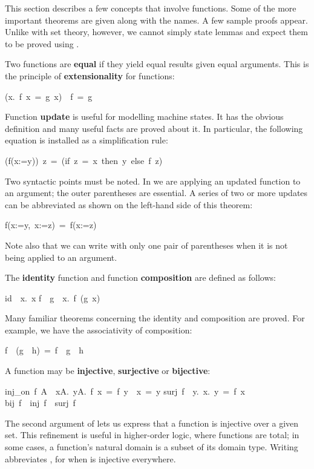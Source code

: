This section describes a few concepts that involve functions. 
Some of the more important theorems are given along with the 
names. A few sample proofs appear. Unlike with set theory, however, 
we cannot simply state lemmas and expect them to be proved using {}. 

Two functions are \textbf{equal} if they yield equal results given equal arguments. 
This is the principle of \textbf{extensionality} for functions:
\begin{isabelle}
({\isasymAnd}x.\ f\ x\ =\ g\ x)\ {\isasymLongrightarrow}\ f\ =\ g
\end{isabelle}


Function \textbf{update} is useful for modelling machine states. It has 
the obvious definition and many useful facts are proved about 
it.  In particular, the following equation is installed as a simplification
rule:
\begin{isabelle}
(f(x:=y))\ z\ =\ (if\ z\ =\ x\ then\ y\ else\ f\ z)
\end{isabelle}
Two syntactic points must be noted.  In
 we are applying an updated function to an
argument; the outer parentheses are essential.  A series of two or more
updates can be abbreviated as shown on the left-hand side of this theorem:
\begin{isabelle}
f(x:=y,\ x:=z)\ =\ f(x:=z)
\end{isabelle}
Note also that we can write  with only one pair of parentheses
when it is not being applied to an argument.

\medskip
The \textbf{identity} function and function \textbf{composition} are defined as 
follows: 
\begin{isabelle}%
id\ \isasymequiv\ {\isasymlambda}x.\ x%
\isanewline
f\ \isasymcirc\ g\ \isasymequiv\
{\isasymlambda}x.\ f\
(g\ x)%
\end{isabelle}
%
Many familiar theorems concerning the identity and composition 
are proved. For example, we have the associativity of composition: 
\begin{isabelle}
f\ \isasymcirc\ (g\ \isasymcirc\ h)\ =\ f\ \isasymcirc\ g\ \isasymcirc\ h
\end{isabelle}

\medskip

A function may be \textbf{injective}, \textbf{surjective} or \textbf{bijective}: 
\begin{isabelle}
inj_on\ f\ A\ \isasymequiv\ {\isasymforall}x\isasymin A.\
{\isasymforall}y\isasymin  A.\ f\ x\ =\ f\ y\ \isasymlongrightarrow\ x\
=\ y%
\isanewline
surj\ f\ \isasymequiv\ {\isasymforall}y.\
{\isasymexists}x.\ y\ =\ f\ x%
\rulename{surj_def}\isanewline
bij\ f\ \isasymequiv\ inj\ f\ \isasymand\ surj\ f
\rulename{bij_def}
\end{isabelle}
The second argument
of \isa{inj_on} lets us express that a function is injective over a
given set. This refinement is useful in higher-order logic, where
functions are total; in some cases, a function's natural domain is a subset
of its domain type.  Writing  abbreviates , for when  is injective everywhere.

